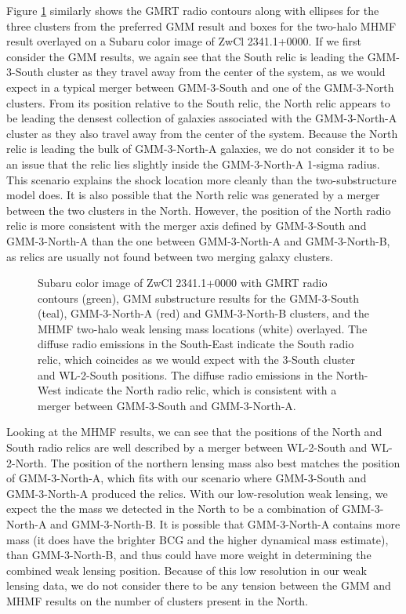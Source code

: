 \documentclass[onecolumn]{aastex}
\begin{document}
Figure \ref{fig16} similarly shows the GMRT radio contours along with ellipses for the three clusters from the preferred GMM result and boxes for the two-halo MHMF result overlayed on a Subaru color image of ZwCl 2341.1+0000.  If we first consider the GMM results, we again see that the South relic is leading the GMM-3-South cluster as they travel away from the center of the system, as we would expect in a typical merger between GMM-3-South and one of the GMM-3-North clusters.  From its position relative to the South relic, the North relic appears to be leading the densest collection of galaxies associated with the GMM-3-North-A cluster as they also travel away from the center of the system.  Because the North relic is leading the bulk of GMM-3-North-A galaxies, we do not consider it to be an issue that the relic lies slightly inside the GMM-3-North-A 1-sigma radius.  This scenario explains the shock location more cleanly than the two-substructure model does.  It is also possible that the North relic was generated by a merger between the two clusters in the North.  However, the position of the North radio relic is more consistent with the merger axis defined by GMM-3-South and GMM-3-North-A than the one between GMM-3-North-A and GMM-3-North-B, as relics are usually not found between two merging galaxy clusters.  

\begin{figure}
\caption{Subaru color image of ZwCl 2341.1+0000 with GMRT radio contours (green), GMM substructure results for the GMM-3-South (teal), GMM-3-North-A (red) and GMM-3-North-B clusters, and the MHMF two-halo weak lensing mass locations (white) overlayed.  The diffuse radio emissions in the South-East indicate the South radio relic, which coincides as we would expect with the 3-South cluster and WL-2-South positions.  The diffuse radio emissions in the North-West indicate the North radio relic, which is consistent with a merger between GMM-3-South and GMM-3-North-A.\label{fig16}} 
\end{figure}

Looking at the MHMF results, we can see that the positions of the North and South radio relics are well described by a merger between WL-2-South and WL-2-North.  The position of the northern lensing mass also best matches the position of GMM-3-North-A, which fits with our scenario where GMM-3-South and GMM-3-North-A produced the relics.  With our low-resolution weak lensing, we expect the the mass we detected in the North to be a combination of GMM-3-North-A and GMM-3-North-B.  It is possible that GMM-3-North-A contains more mass (it does have the brighter BCG and the higher dynamical mass estimate), than GMM-3-North-B, and thus could have more weight in determining the combined weak lensing position.  Because of this low resolution in our weak lensing data, we do not consider there to be any tension between the GMM and MHMF results on the number of clusters present in the North.  
\end{document}
